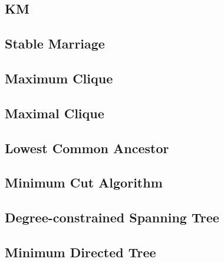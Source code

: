 \documentclass[a4paper,5pt,twocolumn,titlepage]{article}
\begin{document}
\begin{CJK*}{GBK}{song}
\subsection{KM}

\subsection{Stable Marriage}

\subsection{Maximum Clique}

\subsection{Maximal Clique}

\subsection{Lowest Common Ancestor}

\subsection{Minimum Cut Algorithm}

\subsection{Degree-constrained Spanning Tree}

\subsection{Minimum Directed Tree}

\end{CJK*}
\end{document}
